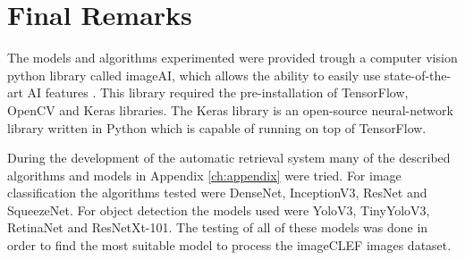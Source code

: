 \section{Final Remarks}


The models and algorithms experimented were provided trough a computer vision python library called imageAI, which allows the ability to easily use state-of-the-art AI features \cite{ImageAI}. This library required the pre-installation of TensorFlow, OpenCV and Keras libraries. The Keras library \cite{CholletFrancois2015} is an open-source neural-network library written in Python which is capable of running on top of TensorFlow.

During the development of the automatic retrieval system many of the described algorithms and models in Appendix \ref{ch:appendix} were tried. For image classification the algorithms tested were DenseNet, InceptionV3, ResNet and SqueezeNet. For object detection the models used were YoloV3, TinyYoloV3, RetinaNet and ResNetXt-101. The testing of all of these models was done in order to find the most suitable model to process the imageCLEF images dataset.